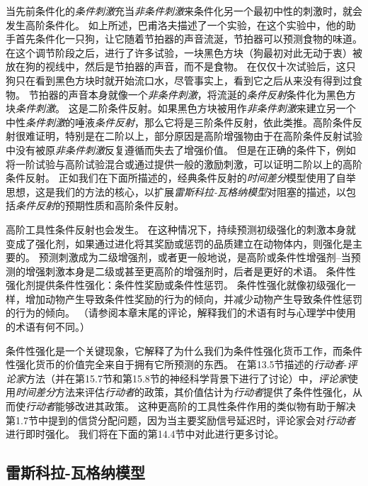 当先前条件化的\textit{条件刺激}充当\textit{非条件刺激}来条件化另一个最初中性的刺激时，就会发生高阶条件化。
如上所述，巴甫洛夫描述了一个实验，在这个实验中，他的助手首先条件化一只狗，让它随着节拍器的声音流涎，节拍器可以预测食物的味道。
在这个调节阶段之后，进行了许多试验，一块黑色方块（狗最初对此无动于衷）被放在狗的视线中，然后是节拍器的声音，而不是食物。
在仅仅十次试验后，这只狗只在看到黑色方块时就开始流口水，尽管事实上，看到它之后从来没有得到过食物。
节拍器的声音本身就像一个\textit{非条件刺激}，将流涎的\textit{条件反射}条件化为黑色方块\textit{条件刺激}。
这是二阶条件反射。如果黑色方块被用作\textit{非条件刺激}来建立另一个中性\textit{条件刺激}的唾液\textit{条件反射}，那么它将是三阶条件反射，依此类推。高阶条件反射很难证明，特别是在二阶以上，部分原因是高阶增强物由于在高阶条件反射试验中没有被原\textit{非条件刺激}反复遵循而失去了增强价值。
但是在正确的条件下，例如将一阶试验与高阶试验混合或通过提供一般的激励刺激，可以证明二阶以上的高阶条件反射。
正如我们在下面所描述的，经典条件反射的\textit{时间差分}模型使用了自举思想，这是我们的方法的核心，以扩展\textit{雷斯科拉-瓦格纳模型}对阻塞的描述，以包括\textit{条件反射}的预期性质和高阶条件反射。


高阶工具性条件反射也会发生。
在这种情况下，持续预测初级强化的刺激本身就变成了强化剂，如果通过进化将其奖励或惩罚的品质建立在动物体内，则强化是主要的。
预测刺激成为二级增强剂，或者更一般地说，是高阶或条件性增强剂--当预测的增强刺激本身是二级或甚至更高阶的增强剂时，后者是更好的术语。
条件性强化剂提供条件性强化：条件性奖励或条件性惩罚。
条件性强化就像初级强化一样，增加动物产生导致条件性奖励的行为的倾向，并减少动物产生导致条件性惩罚的行为的倾向。
（请参阅本章末尾的评论，解释我们的术语有时与心理学中使用的术语有何不同。）



条件性强化是一个关键现象，它解释了为什么我们为条件性强化货币工作，而条件性强化货币的价值完全来自于拥有它所预测的东西。
在第13.5节描述的\textit{行动者}-\textit{评论家}方法（并在第15.7节和第15.8节的神经科学背景下进行了讨论）中，\textit{评论家}使用\textit{时间差分}方法来评估\textit{行动者}的政策，其价值估计为\textit{行动者}提供了条件性强化，从而使\textit{行动者}能够改进其政策。
这种更高阶的工具性条件作用的类似物有助于解决第1.7节中提到的信贷分配问题，因为当主要奖励信号延迟时，评论家会对\textit{行动者}进行即时强化。
我们将在下面的第14.4节中对此进行更多讨论。


\subsection{雷斯科拉-瓦格纳模型} \label{sec:rescorla_wagner}

